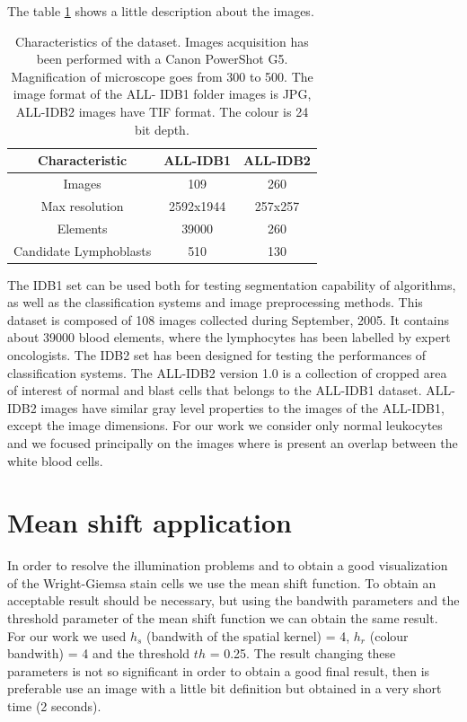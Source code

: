 \bigskip

The table \ref{tableidb} shows a little description about the images.
\begin{table}
\centering
\begin{tabular}{|c|c|c|}
\hline 
Characteristic & ALL-IDB1 & ALL-IDB2 \\ 
\hline 
Images & 109 & 260 \\ 
\hline 
Max resolution & 2592x1944 & 257x257 \\ 
\hline 
Elements & 39000 & 260 \\ 
\hline 
Candidate Lymphoblasts & 510 & 130 \\ 
\hline 
\end{tabular} 
\caption{Characteristics of the dataset. Images acquisition has been performed with a Canon PowerShot G5. Magnification of microscope goes from 300 to 500. The image format of the ALL- IDB1 folder images is JPG, ALL-IDB2 images have TIF format. The colour is 24 bit depth.}
\label{tableidb}
\end{table}
The IDB1 set can be used both for testing segmentation capability of algorithms, as well as the classification systems and image preprocessing methods. This dataset is composed of 108 images collected during September, 2005. It contains about 39000 blood elements, where the lymphocytes has been labelled by expert oncologists.\cite{website:IDB}
The IDB2 set has been designed for testing the performances of classification systems. The ALL-IDB2 version 1.0 is a collection of cropped area of interest of normal and blast cells that belongs to the ALL-IDB1 dataset. ALL-IDB2 images have similar gray level properties to the images of the ALL-IDB1, except the image dimensions.\cite{website:IDB}
For our work we consider only normal leukocytes and we focused principally on the images where is present an overlap between the white blood cells.

\section{Mean shift application}
In order to resolve the illumination problems and to obtain a good visualization of the Wright-Giemsa stain cells we use the mean shift function. To obtain an acceptable result should be necessary, but using the bandwith parameters and the threshold parameter of the mean shift function we can obtain the same result. For our work we used $h_{s}$ (bandwith of the spatial kernel) = 4, $h_{r}$ (colour bandwith) = 4 and the threshold $th$ = 0.25. The result changing these parameters is not so significant in order to obtain a good final result, then is preferable use an image with a little bit definition but obtained in a very short time (2 seconds).

